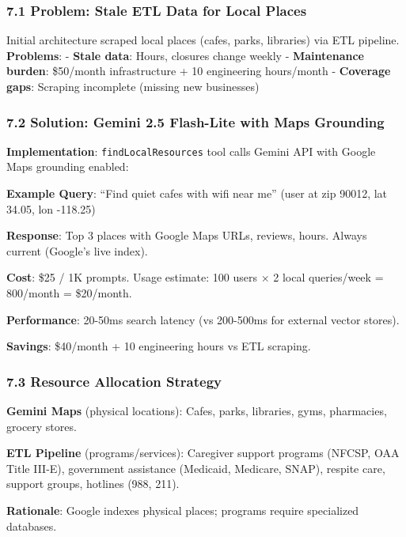 \documentclass[
]{article}
\begin{document}
\subsubsection{7.1 Problem: Stale ETL Data for Local
Places}\label{problem-stale-etl-data-for-local-places}

Initial architecture scraped local places (cafes, parks, libraries) via
ETL pipeline. \textbf{Problems}: - \textbf{Stale data}: Hours, closures
change weekly - \textbf{Maintenance burden}: \$50/month infrastructure +
10 engineering hours/month - \textbf{Coverage gaps}: Scraping incomplete
(missing new businesses)

\subsubsection{7.2 Solution: Gemini 2.5 Flash-Lite with Maps
Grounding}\label{solution-gemini-2.5-flash-lite-with-maps-grounding}

\textbf{Implementation}: \texttt{findLocalResources} tool calls Gemini
API with Google Maps grounding enabled:

\textbf{Example Query}: ``Find quiet cafes with wifi near me'' (user at
zip 90012, lat 34.05, lon -118.25)

\textbf{Response}: Top 3 places with Google Maps URLs, reviews, hours.
Always current (Google's live index).

\textbf{Cost}: \$25 / 1K prompts. Usage estimate: 100 users × 2 local
queries/week = 800/month = \$20/month.

\textbf{Performance}: 20-50ms search latency (vs 200-500ms for external
vector stores).

\textbf{Savings}: \$40/month + 10 engineering hours vs ETL scraping.

\subsubsection{7.3 Resource Allocation
Strategy}\label{resource-allocation-strategy}

\textbf{Gemini Maps} (physical locations): Cafes, parks, libraries,
gyms, pharmacies, grocery stores.

\textbf{ETL Pipeline} (programs/services): Caregiver support programs
(NFCSP, OAA Title III-E), government assistance (Medicaid, Medicare,
SNAP), respite care, support groups, hotlines (988, 211).

\textbf{Rationale}: Google indexes physical places; programs require
specialized databases.
\end{document}
